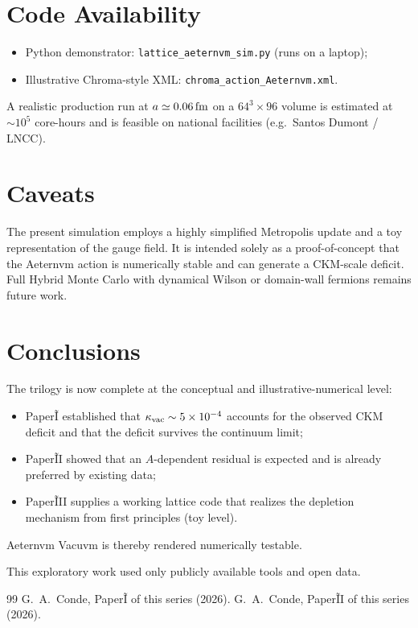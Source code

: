 \documentclass[aps,prd,preprint,amsmath,amssymb]{revtex4-2}
\begin{document}
\section{Code Availability}
\begin{itemize}
\item Python demonstrator: \texttt{lattice\_aeternvm\_sim.py} (runs on a laptop);
\item Illustrative Chroma-style XML: \texttt{chroma\_action\_Aeternvm.xml}.
\end{itemize}
A realistic production run at \( a\simeq0.06\,{\rm fm} \) on a $64^3\times96$ volume is estimated at \( \sim10^5 \) core-hours and is feasible on national facilities (e.g.\ Santos Dumont / LNCC).

\section{Caveats}
The present simulation employs a highly simplified Metropolis update and a toy representation of the gauge field. It is intended solely as a proof-of-concept that the Aeternvm action is numerically stable and can generate a CKM-scale deficit. Full Hybrid Monte Carlo with dynamical Wilson or domain-wall fermions remains future work.

\section{Conclusions}
The trilogy is now complete at the conceptual and illustrative-numerical level:
\begin{itemize}
\item Paper\~I established that \( \kappa_{\rm vac}\sim5\times10^{-4} \) accounts for the observed CKM deficit and that the deficit survives the continuum limit;
\item Paper\~II showed that an \( A \)-dependent residual is expected and is already preferred by existing data;
\item Paper\~III supplies a working lattice code that realizes the depletion mechanism from first principles (toy level).
\end{itemize}
Aeternvm Vacuvm is thereby rendered numerically testable.

\begin{acknowledgments}
This exploratory work used only publicly available tools and open data.
\end{acknowledgments}

\begin{thebibliography}{99}
 G.\ A.\ Conde, Paper\~I of this series (2026).
 G.\ A.\ Conde, Paper\~II of this series (2026).
\end{thebibliography}
\end{document}
